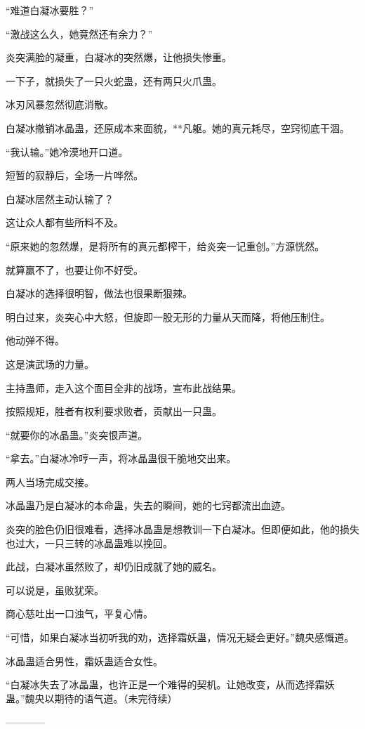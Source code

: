\begin{this_body}
“难道白凝冰要胜？”

“激战这么久，她竟然还有余力？”

炎突满脸的凝重，白凝冰的突然爆，让他损失惨重。

一下子，就损失了一只火蛇蛊，还有两只火爪蛊。

冰刃风暴忽然彻底消散。

白凝冰撤销冰晶蛊，还原成本来面貌，**凡躯。她的真元耗尽，空窍彻底干涸。

“我认输。”她冷漠地开口道。

短暂的寂静后，全场一片哗然。

白凝冰居然主动认输了？

这让众人都有些所料不及。

“原来她的忽然爆，是将所有的真元都榨干，给炎突一记重创。”方源恍然。

就算赢不了，也要让你不好受。

白凝冰的选择很明智，做法也很果断狠辣。

明白过来，炎突心中大怒，但旋即一股无形的力量从天而降，将他压制住。

他动弹不得。

这是演武场的力量。

主持蛊师，走入这个面目全非的战场，宣布此战结果。

按照规矩，胜者有权利要求败者，贡献出一只蛊。

“就要你的冰晶蛊。”炎突恨声道。

“拿去。”白凝冰冷哼一声，将冰晶蛊很干脆地交出来。

两人当场完成交接。

冰晶蛊乃是白凝冰的本命蛊，失去的瞬间，她的七窍都流出血迹。

炎突的脸色仍旧很难看，选择冰晶蛊是想教训一下白凝冰。但即便如此，他的损失也过大，一只三转的冰晶蛊难以挽回。

此战，白凝冰虽然败了，却仍旧成就了她的威名。

可以说是，虽败犹荣。

商心慈吐出一口浊气，平复心情。

“可惜，如果白凝冰当初听我的劝，选择霜妖蛊，情况无疑会更好。”魏央感慨道。

冰晶蛊适合男性，霜妖蛊适合女性。

“白凝冰失去了冰晶蛊，也许正是一个难得的契机。让她改变，从而选择霜妖蛊。”魏央以期待的语气道。（未完待续）

------------

\end{this_body}

